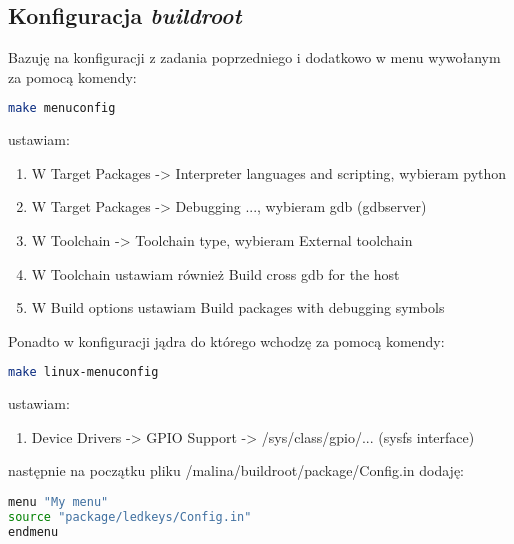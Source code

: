 \subsection{Konfiguracja \emph{buildroot}}
Bazuję na konfiguracji z zadania poprzedniego i dodatkowo w menu wywołanym za pomocą komendy:
	\begin{lstlisting}[language=bash]
make menuconfig
	\end{lstlisting}	
ustawiam:
\begin{enumerate}
	\item W Target Packages -> Interpreter languages and scripting, wybieram python
	\item W Target Packages -> Debugging ..., wybieram gdb (gdbserver)
	\item W Toolchain -> Toolchain type, wybieram External toolchain
	\item W Toolchain ustawiam również Build cross gdb for the host
	\item W Build options ustawiam Build packages with debugging symbols
\end{enumerate}

Ponadto w konfiguracji jądra do którego wchodzę za pomocą komendy:
	\begin{lstlisting}[language=bash]
make linux-menuconfig
	\end{lstlisting}	
ustawiam:
\begin{enumerate}
	\item Device Drivers -> GPIO Support -> /sys/class/gpio/... (sysfs interface)
\end{enumerate}

następnie na początku pliku /malina/buildroot/package/Config.in dodaję:
\begin{lstlisting}[language=bash]
menu "My menu"
source "package/ledkeys/Config.in"
endmenu
\end{lstlisting}

